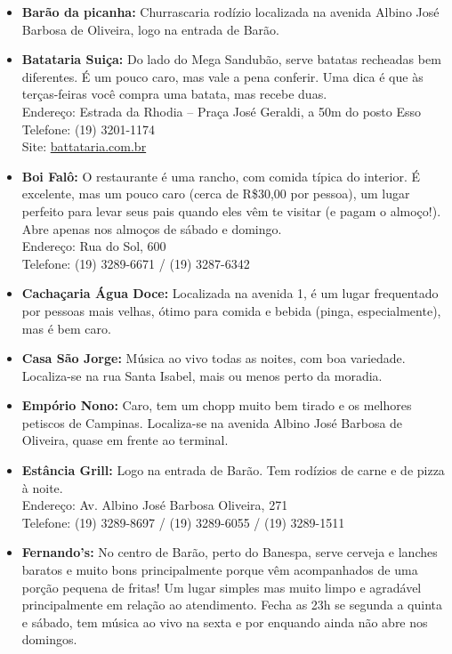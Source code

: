 \begin{itemize}
\item   \textbf{Barão da picanha:} Churrascaria rodízio localizada na avenida
        Albino José Barbosa de Oliveira, logo na entrada de Barão.

\item   \textbf{Batataria Suiça:} Do lado do Mega Sandubão, serve batatas
        recheadas bem diferentes. É um pouco caro, mas vale a pena conferir. Uma
        dica é que às terças-feiras você compra uma batata, mas recebe duas.
        \\Endereço: Estrada da Rhodia -- Praça José Geraldi, a 50m do posto Esso
        \\Telefone: (19) 3201-1174
        \\Site: \url{battataria.com.br}

\item   \textbf{Boi Falô:} O restaurante é uma rancho, com comida típica do
        interior. É excelente, mas um pouco caro (cerca de R\$30,00 por pessoa),
        um lugar perfeito para levar seus pais quando eles vêm te visitar (e
        pagam o almoço!). Abre apenas nos almoços de sábado e domingo.
        \\Endereço: Rua do Sol, 600
        \\Telefone: (19) 3289-6671 / (19) 3287-6342

\item   \textbf{Cachaçaria Água Doce:} Localizada na avenida 1, é um lugar
        frequentado por pessoas mais velhas, ótimo para comida e bebida (pinga,
        especialmente), mas é bem caro.

\item   \textbf{Casa São Jorge:} Música ao vivo todas as noites, com boa
        variedade. Localiza-se na rua Santa Isabel, mais ou menos perto da
        moradia.

\item   \textbf{Empório Nono:} Caro, tem um chopp muito bem tirado e os melhores
        petiscos de Campinas. Localiza-se na avenida Albino José Barbosa de
        Oliveira, quase em frente ao terminal.

\item   \textbf{Estância Grill:} Logo na entrada de Barão. Tem rodízios de
        carne e de pizza à noite.
        \\Endereço: Av. Albino José Barbosa Oliveira, 271
        \\Telefone: (19) 3289-8697 / (19) 3289-6055 / (19) 3289-1511

\item   \textbf{Fernando's:} No centro de Barão, perto do Banespa, serve cerveja
        e lanches baratos e muito bons principalmente porque vêm acompanhados de
        uma porção pequena de fritas! Um lugar simples mas muito limpo e
        agradável principalmente em relação ao atendimento. Fecha as 23h se
        segunda a quinta e sábado, tem música ao vivo na sexta e por enquando
        ainda não abre nos domingos.


\end{itemize}
